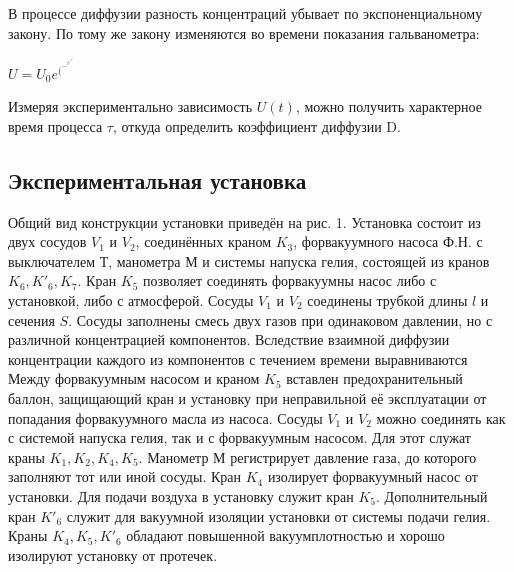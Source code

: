 \documentclass[a4paper, 12pt]{article}
\begin{document}
\begin{center}
\item В процессе диффузии разность концентраций убывает по экспоненциальному закону. По тому же закону изменяются во времени показания гальванометра:
\begin{center}
$\displaystyle U = U_0 e^(^-^t^/^\tau^)$
\end{center}
Измеряя экспериментально зависимость $U(t)$, можно получить характерное время процесса $\tau$, откуда определить коэффициент диффузии D.

\begin{center}
\subsection*{Экспериментальная установка}
\end{center}

\item Общий вид конструкции установки приведён на рис. 1. Установка состоит из двух сосудов $V_1$ и $V_2$, соединённых краном $K_3$, форвакуумного насоса Ф.Н. с выключателем Т, манометра М и системы напуска гелия, состоящей из кранов $K_6, K'_6, K_7$. Кран $K_5$ позволяет соединять форвакуумны насос либо с установкой, либо с атмосферой. Сосуды $V_1$ и $V_2$ соединены трубкой длины $l$ и сечения $S$. Сосуды заполнены смесь двух газов при одинаковом давлении, но с различной концентрацией компонентов. Вследствие взаимной диффузии концентрации каждого из компонентов с течением времени выравниваются Между форвакуумным насосом и краном $K_5$ вставлен предохранительный баллон, защищающий кран и установку при неправильной её эксплуатации от попадания форвакуумного масла из насоса. Сосуды $V_1$ и $V_2$ можно соединять как с системой напуска гелия, так и с форвакуумным насосом. Для этот служат краны $K_1, K_2, K_4, K_5$. Манометр М регистрирует давление газа, до которого заполняют тот или иной сосуды. Кран $K_4$ изолирует форвакуумный насос от установки. Для подачи воздуха в установку служит кран $K_5$. Дополнительный кран $K'_6$ служит для вакуумной изоляции установки от системы подачи гелия. Краны $K_4, K_5, K'_6$ обладают повышенной вакуумплотностью и хорошо изолируют установку от протечек.


\end{center}
\end{document}
